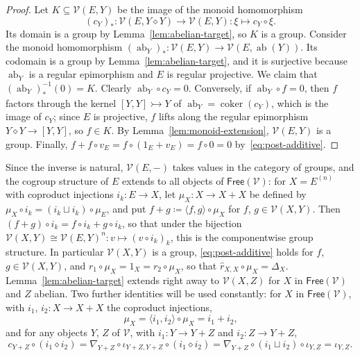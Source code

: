\documentclass[reqno,a4paper]{amsart}
\theoremstyle{plain}
\theoremstyle{definition}
\newcommand{\DefEq}{\coloneq}
\newcommand{\V}{\ensuremath{\mathcal{V}}}
\newcommand{\Free}{\ensuremath{\mathsf{Free}}}
\DeclareMathOperator{\ab}{ab}
\DeclareMathOperator{\coker}{coker}
\newcommand{\cosmash}{\ensuremath{\diamond}}
\newcommand{\cosum}{\ensuremath{\sqcup}}                   %
\newcommand{\cm}[2]{\ensuremath{\hat{r}_{#1,#2}}}          %
\newcommand{\cc}[1]{\ensuremath{c_{#1}}}                    %
\newcommand{\fold}[1]{\ensuremath{\nabla_{#1}}}            %
\newcommand{\diag}[1]{\ensuremath{\Delta_{#1}}}            %
\begin{document}
\begin{proof}
  Let \(K\subseteq\V(E,Y)\) be the image of the monoid homomorphism
  \[
    (\cc{Y})_{*}\colon \V(E,Y\cosmash Y)\to\V(E,Y)\colon \xi\mapsto\cc{Y}\circ\xi\text{.}
  \]
  Its domain is a group by Lemma~\ref{lem:abelian-target}, so \(K\) is a group. Consider the monoid homomorphism \((\ab_{Y})_{*}\colon \V(E,Y)\to\V(E,\ab(Y))\). Its codomain is a group by Lemma~\ref{lem:abelian-target}, and it is surjective because \(\ab_{Y}\) is a regular epimorphism and \(E\) is regular projective. We claim that \((\ab_{Y})_{*}^{-1}(0)=K\). Clearly \(\ab_{Y}\circ\cc{Y}=0\). Conversely, if \(\ab_{Y}\circ f=0\), then \(f\) factors through the kernel \([Y,Y]\rightarrowtail Y\) of \(\ab_{Y}=\coker(\cc{Y})\), which is the image of \(\cc{Y}\); since \(E\) is projective, \(f\) lifts along the regular epimorphism \(Y\cosmash Y\to[Y,Y]\), so \(f\in K\). By Lemma~\ref{lem:monoid-extension}, \(\V(E,Y)\) is a group. Finally, \(f+f\circ v_{E}=f\circ(1_{E}+v_{E})=f\circ 0=0\) by~\eqref{eq:post-additive}.
\end{proof}

Since the inverse is natural, \(\V(E,-)\) takes values in the category of groups, and the cogroup structure of \(E\) extends to all objects of \(\Free(\V)\): for \(X=E^{(n)}\) with coproduct injections \(i_{k}\colon E\to X\), let \(\mu_{X}\colon X\to X+X\) be defined by \(\mu_{X}\circ i_{k}=(i_{k}\cosum i_{k})\circ\mu_{E}\), and put \(f+g\DefEq\langle f,g\rangle\circ\mu_{X}\) for \(f\), \(g\in\V(X,Y)\). Then \((f+g)\circ i_{k}=f\circ i_{k}+g\circ i_{k}\), so that under the bijection \(\V(X,Y)\cong\V(E,Y)^{n}\colon v\mapsto(v\circ i_{k})_{k}\), this is the componentwise group structure. In particular \(\V(X,Y)\) is a group, \eqref{eq:post-additive} holds for \(f\), \(g\in\V(X,Y)\), and \(r_{1}\circ\mu_{X}=1_{X}=r_{2}\circ\mu_{X}\), so that \(\cm{X}{X}\circ\mu_{X}=\diag{X}\). Lemma~\ref{lem:abelian-target} extends right away to \(\V(X,Z)\) for \(X\) in \(\Free(\V)\) and \(Z\) abelian. Two further identities will be used constantly: for \(X\) in \(\Free(\V)\), with \(i_{1}\), \(i_{2}\colon X\to X+X\) the coproduct injections,
\begin{equation}\label{eq:mu-is-sum}
  \mu_{X}=\langle i_{1},i_{2}\rangle\circ\mu_{X}=i_{1}+i_{2}\text{,}
\end{equation}
and for any objects \(Y\), \(Z\) of \(\V\), with \(i_{1}\colon Y\to Y+Z\) and \(i_{2}\colon Z\to Y+Z\),
\begin{equation}\label{eq:c-of-coproduct-injections}
  \cc{Y+Z}\circ(i_{1}\cosmash i_{2})=\fold{Y+Z}\circ\iota_{Y+Z,Y+Z}\circ(i_{1}\cosmash i_{2})=\fold{Y+Z}\circ(i_{1}\cosum i_{2})\circ\iota_{Y,Z}=\iota_{Y,Z}\text{.}
\end{equation}
\end{document}
